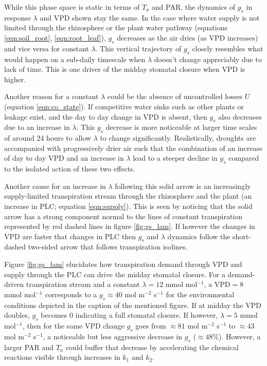 \documentclass[utf8]{frontiersSCNS} %
\begin{document}
While this phase space is static in terms of $T_a$ and PAR, the dynamics of $g_s$ in response $\lambda$ and VPD shown stay the same. In the case where water supply is not limited through the rhizosphere or the plant water pathway (equations \ref{eqn:soil_root}, \ref{eqn:root_leaf}), $g_s$ decreases as the air dries (as VPD increases) and vice versa for constant $\lambda$. This vertical trajectory of $g_s$ closely resembles what would happen on a sub-daily timescale when $\lambda$ doesn't change appreciably due to lack of time. This is one driver of the midday stomatal closure when VPD is higher.

Another reason for a constant $\lambda$ could be the absence of uncontrolled losses $U$ (equation \ref{eqn:co_state}). If competitive water sinks such as other plants or leakage exist, and the day to day change in VPD is absent, then $g_s$ also decreases due to an increase in $\lambda$. This $g_s$ decrease is more noticeable at larger time scales of around 24 hours to allow $\lambda$ to change significantly. Realistically, droughts are accompanied with progressively drier air such that the combination of an increase of day to day VPD and an increase in $\lambda$ lead to a steeper decline in $g_s$ compared to the isolated action of these two effects.

 Another cause for an increase in $\lambda$ following this solid arrow is an increasingly supply-limited transpiration stream through the rhizosphere and the plant (an increase in PLC; equation \ref{eqn:supply}). This is seen by noticing that the solid arrow has a strong component normal to the lines of constant transpiration represented by red dashed lines in figure \ref{fig:gs_lam}. If however the changes in VPD are faster that changes in PLC then $g_s$ and $\lambda$ dynamics follow the short-dashed two-sided arrow that follows transpiration isolines. 

Figure \ref{fig:gs_lam} elucidates how transpiration demand through VPD and supply through the PLC can drive the midday stomatal closure. For a demand-driven transpiration stream and a constant $\lambda=12$ mmol mol$^{-1}$, a VPD$=8$ mmol mol$^{-1}$ corresponds to a $g_s\approx 40$ mol m$^{-2}$ s$^{-1}$ for the environmental conditions depicted in the caption of the mentioned figure. If at midday the VPD doubles, $g_s$ becomes 0 indicating a full stomatal closure. If however, $\lambda=5$ mmol mol$^{-1}$, then for the same VPD change $g_s$ goes from $\approx 81$ mol m$^{-2}$ s$^{-1}$ to $\approx 43$ mol m$^{-2}$ s$^{-1}$, a noticeable but less aggressive decrease in $g_s$ ($\approx 48\%$). However, a larger PAR and $T_a$ could buffer that decrease by accelerating the chemical reactions visible through increases in $k_1$ and $k_2$.
\end{document}
